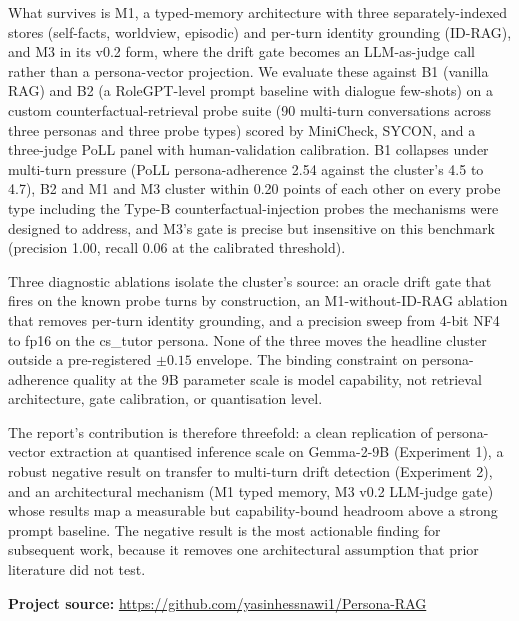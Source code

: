 What survives is M1, a typed-memory architecture with three separately-indexed stores (self-facts, worldview, episodic) and per-turn identity grounding (ID-RAG), and M3 in its v0.2 form, where the drift gate becomes an LLM-as-judge call rather than a persona-vector projection. We evaluate these against B1 (vanilla RAG) and B2 (a RoleGPT-level prompt baseline with dialogue few-shots) on a custom counterfactual-retrieval probe suite (90 multi-turn conversations across three personas and three probe types) scored by MiniCheck, SYCON, and a three-judge PoLL panel with human-validation calibration. B1 collapses under multi-turn pressure (PoLL persona-adherence 2.54 against the cluster's 4.5 to 4.7), B2 and M1 and M3 cluster within 0.20 points of each other on every probe type including the Type-B counterfactual-injection probes the mechanisms were designed to address, and M3's gate is precise but insensitive on this benchmark (precision 1.00, recall 0.06 at the calibrated threshold).

Three diagnostic ablations isolate the cluster's source: an oracle drift gate that fires on the known probe turns by construction, an M1-without-ID-RAG ablation that removes per-turn identity grounding, and a precision sweep from 4-bit NF4 to fp16 on the cs\_tutor persona. None of the three moves the headline cluster outside a pre-registered $\pm 0.15$ envelope. The binding constraint on persona-adherence quality at the 9B parameter scale is model capability, not retrieval architecture, gate calibration, or quantisation level.

The report's contribution is therefore threefold: a clean replication of persona-vector extraction at quantised inference scale on Gemma-2-9B (Experiment 1), a robust negative result on transfer to multi-turn drift detection (Experiment 2), and an architectural mechanism (M1 typed memory, M3 v0.2 LLM-judge gate) whose results map a measurable but capability-bound headroom above a strong prompt baseline. The negative result is the most actionable finding for subsequent work, because it removes one architectural assumption that prior literature did not test.
\bigskip

\noindent\textbf{Project source:} \url{https://github.com/yasinhessnawi1/Persona-RAG}
